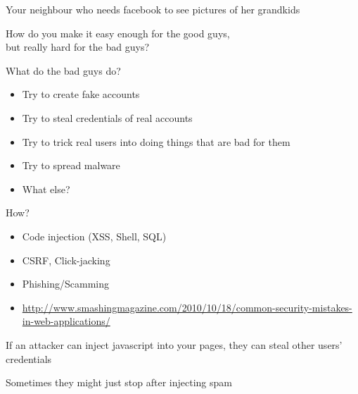 \documentclass{beamer}
\begin{document}
\begin{frame}{}
\begin{center}
Your neighbour who needs facebook to see pictures of her grandkids
\end{center}
\end{frame}

\begin{frame}{}
\begin{center}
How do you make it easy enough for the good guys, \\ but really hard for the bad guys?
\end{center}
\end{frame}

\begin{frame}{What do the bad guys do?}
\begin{itemize}
\item Try to create fake accounts
\item Try to steal credentials of real accounts
\item Try to trick real users into doing things that are bad for them
\item Try to spread malware
\item What else?
\end{itemize}
\end{frame}

\begin{frame}{How?}
\begin{itemize}
\item Code injection (XSS, Shell, SQL)
\item CSRF, Click-jacking
\item Phishing/Scamming
\item \tiny{\href{http://www.smashingmagazine.com/2010/10/18/common-security-mistakes-in-web-applications/}{http://www.smashingmagazine.com/2010/10/18/common-security-mistakes-in-web-applications/}}
\end{itemize}
\end{frame}

\begin{frame}{}
\begin{center}
If an attacker can inject javascript into your pages, they can steal other users' credentials
\end{center}
\end{frame}

\begin{frame}{}
\begin{center}
Sometimes they might just stop after injecting spam
\end{center}
\end{frame}
\end{document}
